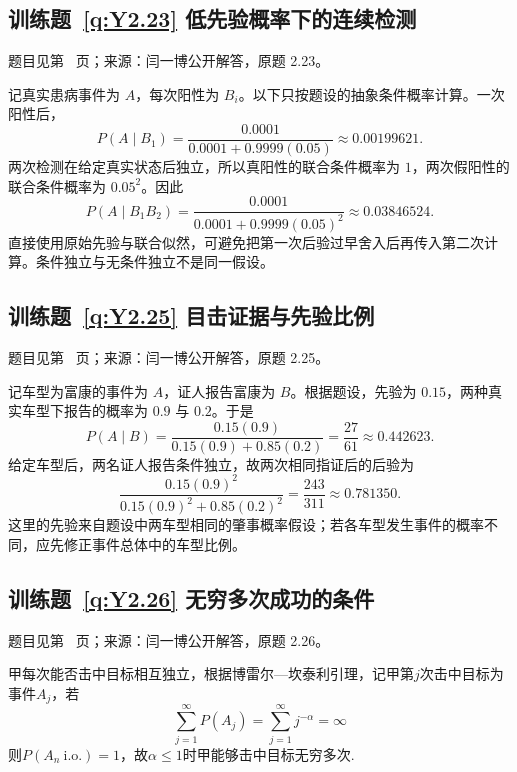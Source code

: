 \documentclass[UTF8,12pt,a4paper,fontset=fandol]{ctexbook}
\begin{document}
\subsection*{训练题~\ref{q:Y2.23} 低先验概率下的连续检测}\label{a:Y2.23}{\small 题目见第~\pageref{q:Y2.23} 页；来源：闫一博公开解答，原题 2.23。}
\begin{solve}记真实患病事件为 $A$，每次阳性为 $B_i$。以下只按题设的抽象条件概率计算。一次阳性后，\[P(A\mid B_1)=\frac{0.0001}{0.0001+0.9999(0.05)}\approx0.00199621.\]两次检测在给定真实状态后独立，所以真阳性的联合条件概率为 $1$，两次假阳性的联合条件概率为 $0.05^2$。因此\[P(A\mid B_1B_2)=\frac{0.0001}{0.0001+0.9999(0.05)^2}\approx0.03846524.\]直接使用原始先验与联合似然，可避免把第一次后验过早舍入后再传入第二次计算。条件独立与无条件独立不是同一假设。\end{solve}

\subsection*{训练题~\ref{q:Y2.25} 目击证据与先验比例}\label{a:Y2.25}{\small 题目见第~\pageref{q:Y2.25} 页；来源：闫一博公开解答，原题 2.25。}
\begin{solve}记车型为富康的事件为 $A$，证人报告富康为 $B$。根据题设，先验为 $0.15$，两种真实车型下报告的概率为 $0.9$ 与 $0.2$。于是\[P(A\mid B)=\frac{0.15(0.9)}{0.15(0.9)+0.85(0.2)}=\frac{27}{61}\approx0.442623.\]给定车型后，两名证人报告条件独立，故两次相同指证后的后验为\[\frac{0.15(0.9)^2}{0.15(0.9)^2+0.85(0.2)^2}=\frac{243}{311}\approx0.781350.\]这里的先验来自题设中两车型相同的肇事概率假设；若各车型发生事件的概率不同，应先修正事件总体中的车型比例。\end{solve}

\subsection*{训练题~\ref{q:Y2.26} 无穷多次成功的条件}\label{a:Y2.26}{\small 题目见第~\pageref{q:Y2.26} 页；来源：闫一博公开解答，原题 2.26。}
\begin{solve}
甲每次能否击中目标相互独立，根据博雷尔—坎泰利引理，记甲第$j$次击中目标为事件$A_j$，若
\[\sum\limits_{j = 1}^\infty  {P({A_j})}  = \sum\limits_{j = 1}^\infty  {{j^{ - \alpha }}}  = \infty \]
则$P(A_n\: \text{i.o.})=1$，故$\alpha\leqslant 1$时甲能够击中目标无穷多次.
\end{solve}
\end{document}
